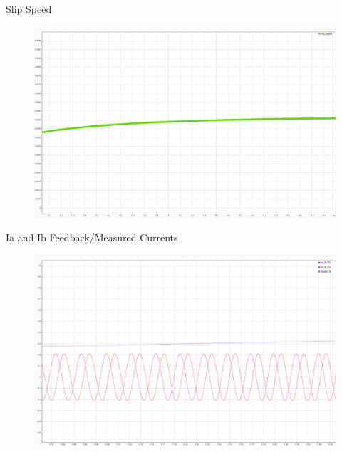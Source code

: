 \begin{frame}{Slip Speed}
	\begin{figure}
		\centering
		\includegraphics[width=\textwidth]{sections/section3/images/simulationResutls/SlipSpeed.png}
	\end{figure}
\end{frame}


\begin{frame}{Ia and Ib Feedback/Measured Currents}
	\begin{figure}
		\centering
		\includegraphics[width=\textwidth]{sections/section3/images/simulationResutls/Ia_Ib_fb.png}
	\end{figure}
\end{frame}

